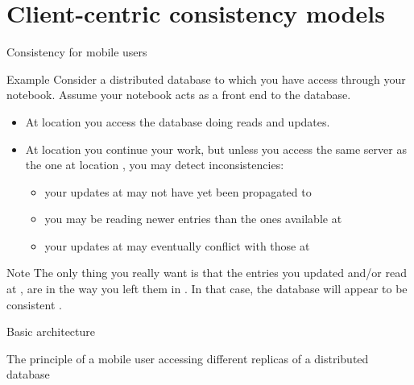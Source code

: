 \section{Client-centric consistency models}
\begin{slide}{Consistency for mobile users}
  \begin{exampleblock}{Example}
    Consider a distributed database to which you have access through your notebook. Assume your notebook acts
    as a front end to the database.
    \begin{itemize}
    \item At location  you access the database doing reads and updates.
    \item At location  you continue your work, but unless you access the same server as the one at location
      , you may detect inconsistencies:
      \begin{itemize}\tightlist
      \item your updates at  may not have yet been propagated to 
      \item you may be reading newer entries than the ones available at 
      \item your updates at  may eventually conflict with those at 
      \end{itemize}
    \end{itemize}
  \end{exampleblock}
  \begin{alertblock}{Note}
    The only thing you really want is that the entries you updated and/or read at , are in  the
    way you left them in . In that case, the database will appear to be consistent .
  \end{alertblock}
\end{slide}
\begin{slide}{Basic architecture}
  \begin{block}{The principle of a mobile user accessing different replicas of a distributed database}
    \begin{centerfig}
    \end{centerfig}
  \end{block}
\end{slide}
